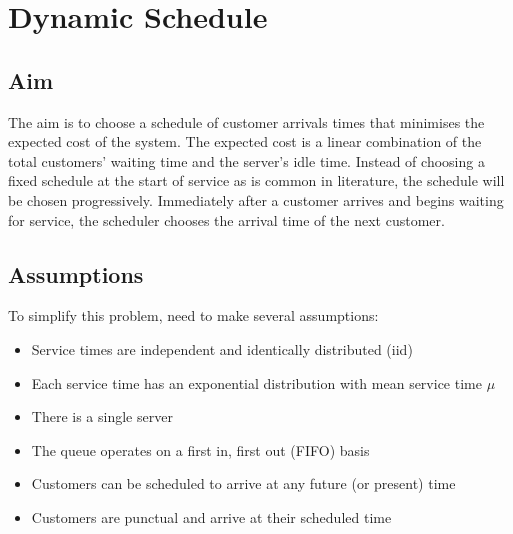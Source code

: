 \chapter{Dynamic Schedule}
\section{Aim}
The aim is to choose a schedule of customer arrivals times that minimises the expected cost of the system. The expected cost is a linear combination of the total customers' waiting time and the server's idle time. Instead of choosing a fixed schedule at the start of service as is common in literature, the schedule will be chosen progressively. Immediately after a customer arrives and begins waiting for service, the scheduler chooses the arrival time of the next customer.

\section{Assumptions}
To simplify this problem, need to make several assumptions:
\begin{itemize}[nosep]
	\item Service times are independent and identically distributed (iid)
	\item Each service time has an exponential distribution with mean service time $\mu$
	\item There is a single server
	\item The queue operates on a first in, first out (FIFO) basis
	\item Customers can be scheduled to arrive at any future (or present) time
	\item Customers are punctual and arrive at their scheduled time
\end{itemize}

